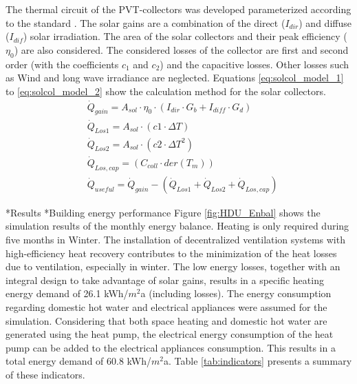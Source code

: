 \documentclass[twocolumn, a4paper,10pt]{article}
\makeatletter
\renewcommand\section{\@startsection{section}{1}{\z@}{3pt}{3pt}{\normalfont\large\bfseries}}
\renewcommand\subsection{\@startsection{subsection}{1}{\z@}{\z@}{\z@}{\normalfont\normalsize\bfseries}}
\renewcommand\subsection{\@startsection{subsection}{1}{\z@}{\z@}{0.1pt}{\normalfont\normalsize\bfseries}}
\makeatother
\begin{document}
The thermal circuit of the PVT-collectors was developed parameterized according to the standard \citet{ISO9806}. The solar gains are a combination of the direct ($I_{dir}$) and diffuse ($I_{dif}$) solar irradiation. The area of the solar collectors and their peak efficiency ($\eta_0$) are also considered. The considered losses of the collector are first and second order (with the coefficients $c_1$ and $c_2$) and the capacitive losses. Other losses such as Wind and long wave irradiance are neglected. Equations \ref{eq:solcol_model_1} to \ref{eq:solcol_model_2} show the calculation method for the solar collectors. \\

\begingroup
\vspace{-10pt}
\allowdisplaybreaks
\begin{align}
&\dot{Q}_{gain} = A_{sol} \cdot \eta_0 \cdot (I_{dir} \cdot G_b + I_{diff} \cdot G_d)\\
\label{eq:solcol_model_1}
&\dot{Q}_{Los1}=A_{sol} \cdot (c1 \cdot \Delta T)\\
&\dot{Q}_{Los2}=A_{sol} \cdot (c2 \cdot \Delta T^2)\\
&\dot{Q}_{Los,cap}=(C_{coll} \cdot der(T_m))\\
&\dot{Q}_{useful} = \dot{Q}_{gain}-(\dot{Q}_{Los1} + \dot{Q}_{Los2} + \dot{Q}_{Los,cap})
\label{eq:solcol_model_2}
\end{align} 
\endgroup

\section*{Results}
\subsection*{Building energy performance}
Figure \ref{fig:HDU_Enbal} shows the simulation results of the monthly energy balance. Heating is only required during five months in Winter. The installation of decentralized ventilation systems with high-efficiency heat recovery contributes to the minimization of the heat losses due to ventilation, especially in winter. The low energy losses, together with an integral design to take advantage of solar gains, results in a specific heating energy demand of 26.1 kWh/$m^2$a (including losses). The energy consumption regarding domestic hot water and electrical appliances were assumed for the simulation. Considering that both space heating and domestic hot water are generated using the heat pump, the electrical energy consumption of the heat pump can be added to the electrical appliances consumption. This results in a total energy demand of 60.8 kWh/$m^2$a. Table \ref{tab:indicators} presents a summary of these indicators. 
\end{document}
